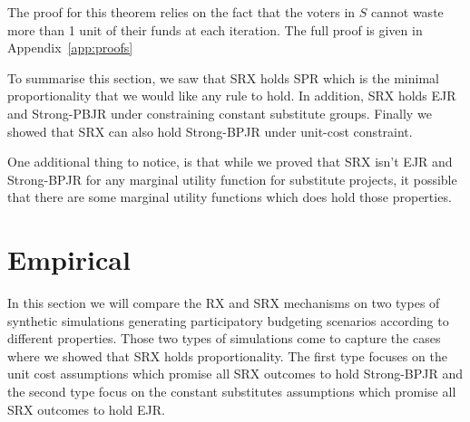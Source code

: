 \documentclass[runningheads]{llncs}
\begin{document}
The proof for this theorem relies on the fact that the voters in $S$ cannot waste more than 1  unit of their funds at each iteration. The full proof is given  in Appendix~\ref{app:proofs}





To summarise this section, we saw that SRX holds SPR which is the minimal proportionality that we would like any rule to hold. In addition, SRX holds EJR and Strong-PBJR under constraining constant substitute groups. Finally we showed that SRX can also hold Strong-BPJR under unit-cost constraint.

One additional thing to notice, is that while we proved that SRX isn't EJR and Strong-BPJR for any marginal utility function for substitute projects, it possible that there are some marginal utility functions which does hold those properties.


\section{Empirical}\label{sec:exp}

In this section we will compare  the RX and SRX mechanisms on two types of synthetic simulations generating participatory budgeting scenarios according to different properties. Those two types of simulations come to capture the cases where we showed that SRX holds proportionality. The first type focuses on the unit cost assumptions which promise all SRX outcomes to hold Strong-BPJR and the second type focus on the constant substitutes assumptions which promise all SRX outcomes to hold EJR.
\end{document}
